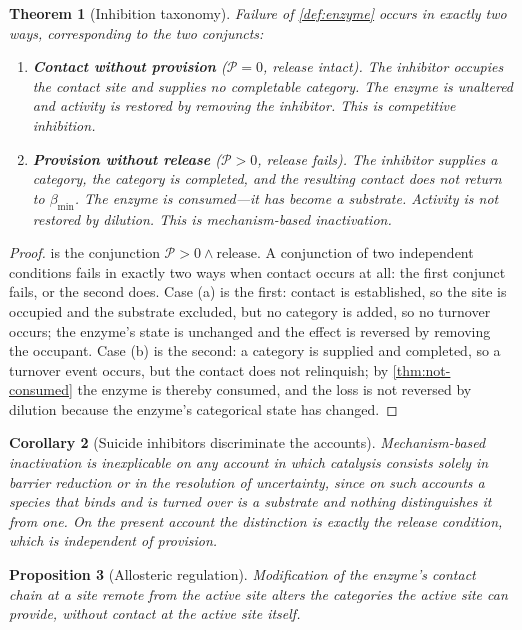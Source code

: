 \documentclass[11pt,twocolumn,a4paper]{article}
\theoremstyle{plain}
\newtheorem{theorem}{Theorem}[section]
\newtheorem{proposition}[theorem]{Proposition}
\newtheorem{corollary}[theorem]{Corollary}
\theoremstyle{definition}
\theoremstyle{remark}
\newcommand{\thick}{\beta}
\newcommand{\floor}{\thick_{\min}}
\newcommand{\prov}{\mathcal{P}}
\begin{document}
\begin{theorem}[Inhibition taxonomy]
\label{thm:inhibition}
Failure of \cref{def:enzyme} occurs in exactly two ways, corresponding to the
two conjuncts:
\begin{enumerate}[label=(\alph*),leftmargin=2.5em]
\item \textbf{Contact without provision} ($\prov = 0$, release intact). The
inhibitor occupies the contact site and supplies no completable category. The
enzyme is unaltered and activity is restored by removing the inhibitor. This is
\emph{competitive inhibition}.
\item \textbf{Provision without release} ($\prov > 0$, release fails). The
inhibitor supplies a category, the category is completed, and the resulting
contact does not return to $\floor$. The enzyme is consumed---it has become a
substrate. Activity is not restored by dilution. This is \emph{mechanism-based
inactivation}.
\end{enumerate}
\end{theorem}

\begin{proof}
 is the conjunction $\prov > 0 \wedge \text{release}$. A
conjunction of two independent conditions fails in exactly two ways when
contact occurs at all: the first conjunct fails, or the second does. Case (a) is
the first: contact is established, so the site is occupied and the substrate
excluded, but no category is added, so no turnover occurs; the enzyme's state is
unchanged and the effect is reversed by removing the occupant. Case (b) is the
second: a category is supplied and completed, so a turnover event occurs, but
the contact does not relinquish; by \cref{thm:not-consumed} the enzyme is
thereby consumed, and the loss is not reversed by dilution because the enzyme's
categorical state has changed.
\end{proof}

\begin{corollary}[Suicide inhibitors discriminate the accounts]
\label{cor:suicide-discriminates}
Mechanism-based inactivation is inexplicable on any account in which catalysis
consists solely in barrier reduction or in the resolution of uncertainty, since
on such accounts a species that binds and is turned over is a substrate and
nothing distinguishes it from one. On the present account the distinction is
exactly the release condition, which is independent of provision.
\end{corollary}

\begin{proposition}[Allosteric regulation]
\label{prop:allostery}
Modification of the enzyme's contact chain at a site remote from the active site
alters the categories the active site can provide, without contact at the active
site itself.
\end{proposition}
\end{document}
